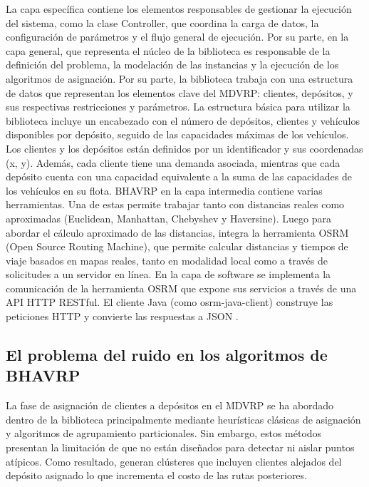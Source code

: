 La capa específica contiene los elementos responsables de gestionar la ejecución del sistema, como la clase Controller, que coordina la carga de datos, la configuración de parámetros y el flujo general de ejecución. Por su parte, en la capa general, que representa el núcleo de la biblioteca es responsable de la definición del problema, la modelación de las instancias y la ejecución de los algoritmos de asignación. Por su parte, la biblioteca trabaja con una estructura de datos que representan los elementos clave del MDVRP: clientes, depósitos, y sus respectivas restricciones y parámetros. La estructura básica para utilizar la biblioteca incluye un encabezado con el número de depósitos, clientes y vehículos disponibles por depósito, seguido de las capacidades máximas de los vehículos. Los clientes y los depósitos están definidos por un identificador y sus coordenadas (x, y). Además, cada cliente tiene una demanda asociada, mientras que cada depósito cuenta con una capacidad equivalente a la suma de las capacidades de los vehículos en su flota. BHAVRP en la capa intermedia contiene varias herramientas. Una de estas permite trabajar tanto con distancias reales como aproximadas (Euclidean, Manhattan, Chebyshev y Haversine). Luego para abordar el cálculo aproximado de las distancias, integra la herramienta OSRM (Open Source Routing Machine), que permite calcular distancias y tiempos de viaje basados en mapas reales, tanto en modalidad local como a través de solicitudes a un servidor en línea. En la capa de software se implementa la comunicación de la herramienta OSRM que expone sus servicios a través de una API HTTP RESTful. El cliente Java (como osrm-java-client) construye las peticiones HTTP y convierte las respuestas a JSON \parencite{ericramosaragonIncorporacionModuloMetricas2025}.

\subsection{El problema del ruido en los algoritmos de BHAVRP}
\label{sec:ruido_mdvrp}

La fase de asignación de clientes a depósitos en el MDVRP se ha abordado dentro de la biblioteca principalmente mediante heurísticas clásicas de asignación y algoritmos de agrupamiento particionales. Sin embargo, estos métodos presentan la limitación de que no están diseñados para detectar ni aislar puntos atípicos. Como resultado, generan clústeres que incluyen clientes alejados del depósito asignado lo que incrementa el costo de las rutas posteriores.

